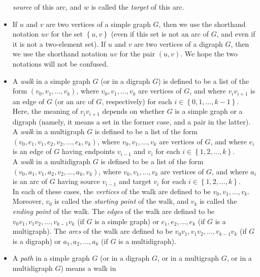 \documentclass[numbers=enddot,12pt,final,onecolumn,notitlepage]{scrartcl}%
\theoremstyle{definition}
\newcommand{\set}[1]{\left\{ #1 \right\}}
\newcommand{\tup}[1]{\left( #1 \right)}
\begin{document}
\begin{itemize}
      \textit{source} of this arc, and $w$ is called the
      \textit{target} of this arc.
\item If $u$ and $v$ are two vertices of a simple graph $G$, then we
      use the shorthand notation $uv$ for the set $\set{u, v}$ (even
      if this set is not an arc of $G$, and even if it is not a
      two-element set). If $u$ and $v$ are two vertices of a digraph
      $G$, then we use the shorthand notation $uv$ for the pair
      $\tup{u, v}$. We hope the two notations will not be confused.
\item A \textit{walk} in a simple graph $G$ (or in a digraph $G$) is
      defined to be a list of the form $\tup{v_0, v_1, \ldots, v_k}$,
      where $v_0, v_1, \ldots, v_k$ are vertices of $G$, and where
      $v_i v_{i+1}$ is an edge of $G$ (or an arc of $G$, respectively)
      for each $i \in \set{0, 1, \ldots, k-1}$. Here, the meaning of
      $v_i v_{i+1}$ depends on whether $G$ is a simple graph or a
      digraph (namely, it means a set in the former case,
      and a pair in the latter). \\
      A \textit{walk} in a multigraph $G$ is defined to be a list of
      the form
      $\tup{v_0, e_1, v_1, e_2, v_2, \ldots, e_k, v_k}$, where
      $v_0, v_1, \ldots, v_k$ are vertices of $G$, and where $e_i$ is
      an edge of $G$ having endpoints $v_{i-1}$ and $v_i$ for each
      $i \in \set{1, 2, \ldots, k}$. \\
      A \textit{walk} in a multidigraph $G$ is defined to be a list of
      the form $\tup{v_0, a_1, v_1, a_2, v_2, \ldots, a_k, v_k}$,
      where $v_0, v_1, \ldots, v_k$ are vertices of $G$, and where
      $a_i$ is an arc of $G$ having source $v_{i-1}$ and target $v_i$
      for each $i \in \set{1, 2, \ldots, k}$. \\
      In each of these cases, the \textit{vertices} of the walk are
      defined to be $v_0, v_1, \ldots, v_k$. Moreover, $v_0$ is called
      the \textit{starting point} of the walk, and $v_k$ is called the
      \textit{ending point} of the walk. The \textit{edges} of the
      walk are defined to be $v_0 v_1, v_1 v_2, \ldots, v_{k-1} v_k$
      (if $G$ is a simple graph) or
      $e_1, e_2, \ldots, e_k$ (if $G$ is a multigraph). The
      \textit{arcs} of the walk are defined to be
      $v_0 v_1, v_1 v_2, \ldots, v_{k-1} v_k$
      (if $G$ is a digraph) or
      $a_1, a_2, \ldots, a_k$ (if $G$ is a multidigraph).
\item A \textit{path} in a simple graph $G$ (or in a digraph $G$, or
      in a multigraph $G$, or in a multidigraph $G$) means a walk in

\end{itemize}
\end{document}
